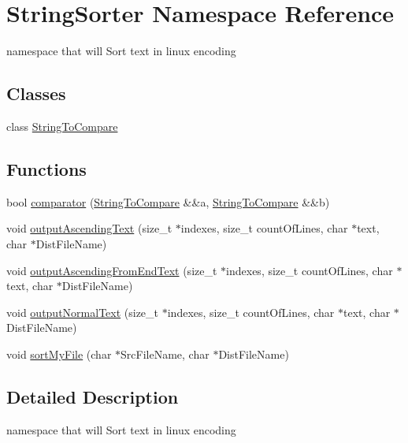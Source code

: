 \hypertarget{namespaceStringSorter}{}\section{String\+Sorter Namespace Reference}
\label{namespaceStringSorter}


namespace that will Sort text in linux encoding  


\subsection*{Classes}
\begin{DoxyCompactItemize}
\item 
class \hyperlink{classStringSorter_1_1StringToCompare}{String\+To\+Compare}
\end{DoxyCompactItemize}
\subsection*{Functions}
\begin{DoxyCompactItemize}
\item 
bool \hyperlink{namespaceStringSorter_aaec9bf5e9700c12c60a776b1bfa1482a}{comparator} (\hyperlink{classStringSorter_1_1StringToCompare}{String\+To\+Compare} \&\&a, \hyperlink{classStringSorter_1_1StringToCompare}{String\+To\+Compare} \&\&b)
\item 
void \hyperlink{namespaceStringSorter_af7a15976538bdcbc36377418cbf6c54c}{output\+Ascending\+Text} (size\+\_\+t $\ast$indexes, size\+\_\+t count\+Of\+Lines, char $\ast$text, char $\ast$Dist\+File\+Name)
\item 
void \hyperlink{namespaceStringSorter_aef5de617e1c1d77d92224c3f98924dc3}{output\+Ascending\+From\+End\+Text} (size\+\_\+t $\ast$indexes, size\+\_\+t count\+Of\+Lines, char $\ast$text, char $\ast$Dist\+File\+Name)
\item 
void \hyperlink{namespaceStringSorter_a8884132688cb022da1f41dac3eb21d75}{output\+Normal\+Text} (size\+\_\+t $\ast$indexes, size\+\_\+t count\+Of\+Lines, char $\ast$text, char $\ast$Dist\+File\+Name)
\item 
void \hyperlink{namespaceStringSorter_a2e107a1808086f5e183cd5c9c48fe824}{sort\+My\+File} (char $\ast$Src\+File\+Name, char $\ast$Dist\+File\+Name)
\end{DoxyCompactItemize}


\subsection{Detailed Description}
namespace that will Sort text in linux encoding 

